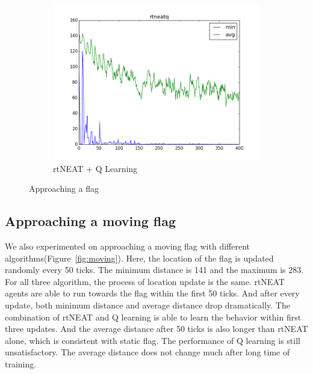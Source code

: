 \documentclass[letterpaper]{article}
\begin{document}
\begin{figure}[ht]
\begin{subfigure}{0.7\columnwidth}
  \includegraphics[width=\columnwidth]{flag_rtneatq.png}
  \caption{rtNEAT + Q Learning}
  \label{fig:flag_neatq}
\end{subfigure}
\caption{Approaching a flag}
\label{fig:flag}
\end{figure}

\subsection{Approaching a moving flag}
We also experimented on approaching a moving flag with different algorithms(Figure~\ref{fig:moving}). Here, the location of the flag is updated randomly every 50 ticks. The minimum distance is 141 and the maximum is 283. For all three algorithm, the process of location update is the same. rtNEAT agents are able to run towards the flag within the first 50 ticks. And after every update, both minimum distance and average distance drop dramatically. The combination of rtNEAT and Q learning is able to learn the behavior within first three updates. And the average distance after 50 ticks is also longer than rtNEAT alone, which is consistent with static flag. The performance of Q learning is still unsatisfactory. The average distance does not change much after long time of training.
\end{document}
